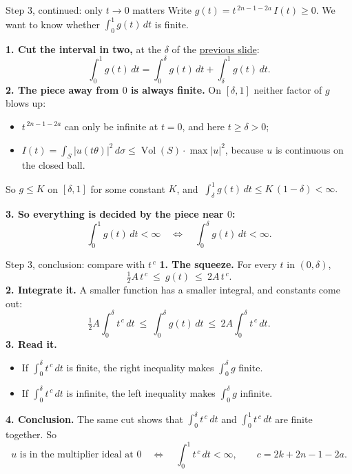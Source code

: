 \begin{frame}{Step 3, continued: only \(t\to0\) matters}
Write \(g(t)=t^{\,2n-1-2a}\,I(t)\ge0\). We want to know whether \(\int_0^1g(t)\,dt\) is finite.
\par
\textbf{1. Cut the interval in two,} at the \(\delta\) of the \hyperlink{fr:ex-step3}{previous slide}:
\[
\int_0^1g(t)\,dt=\int_0^\delta g(t)\,dt+\int_\delta^1g(t)\,dt .
\]
\textbf{2. The piece away from \(0\) is always finite.} On \([\delta,1]\) neither factor of \(g\) blows up:
\begin{itemize}
\item \(t^{\,2n-1-2a}\) can only be infinite at \(t=0\), and here \(t\ge\delta>0\);
\item \(I(t)=\int_S|u(t\theta)|^2\,d\sigma\le\operatorname{Vol}(S)\cdot\max|u|^2\), because \(u\) is continuous on the closed ball.
\end{itemize}
So \(g\le K\) on \([\delta,1]\) for some constant \(K\), and
\(\ \int_\delta^1g(t)\,dt\le K\,(1-\delta)<\infty .\)
\par\medskip
\textbf{3. So everything is decided by the piece near \(0\):}
\[
\int_0^1g(t)\,dt<\infty\quad\Longleftrightarrow\quad\int_0^\delta g(t)\,dt<\infty .
\]
\end{frame}

\begin{frame}{Step 3, conclusion: compare with \(t^{\,c}\)}
\label{fr:step-conclusion-compare-with-49}
\textbf{1. The squeeze.} For every \(t\) in \((0,\delta)\),
\[
\tfrac12A\,t^{\,c}\ \le\ g(t)\ \le\ 2A\,t^{\,c}.
\]
\textbf{2. Integrate it.} A smaller function has a smaller integral, and constants come out:
\[
\tfrac12A\int_0^\delta t^{\,c}\,dt\ \le\ \int_0^\delta g(t)\,dt\ \le\ 2A\int_0^\delta t^{\,c}\,dt .
\]
\textbf{3. Read it.}
\begin{itemize}
\item If \(\int_0^\delta t^{\,c}\,dt\) is finite, the right inequality makes \(\int_0^\delta g\) finite.
\item If \(\int_0^\delta t^{\,c}\,dt\) is infinite, the left inequality makes \(\int_0^\delta g\) infinite.
\end{itemize}
\textbf{4. Conclusion.} The same cut shows that \(\int_0^\delta t^{\,c}\,dt\) and \(\int_0^1t^{\,c}\,dt\) are finite together. So
\[
\boxed{u \text{ is in the multiplier ideal at } 0
\quad\Longleftrightarrow\quad
\int_0^{1}t^{\,c}\,dt<\infty ,\qquad c=2k+2n-1-2a .}
\]
\end{frame}

